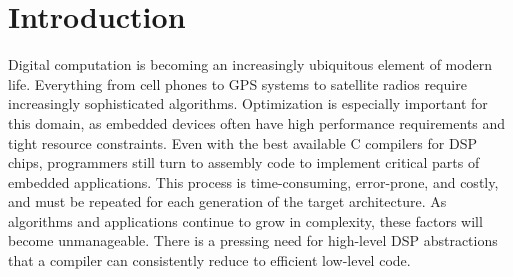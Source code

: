  

\section{Introduction}
Digital computation is becoming an increasingly ubiquitous element of
modern life.  Everything from cell phones to GPS systems to satellite
radios require increasingly sophisticated algorithms.  Optimization is
especially important for this domain, as embedded devices often have
high performance requirements and tight resource constraints.  Even
with the best available C compilers for DSP chips, programmers still
turn to assembly code to implement critical parts of embedded
applications.  This process is time-consuming, error-prone, and
costly, and must be repeated for each generation of the target
architecture.  As algorithms and applications continue to grow in
complexity, these factors will become unmanageable.  There is a
pressing need for high-level DSP abstractions that a compiler can
consistently reduce to efficient low-level code.

